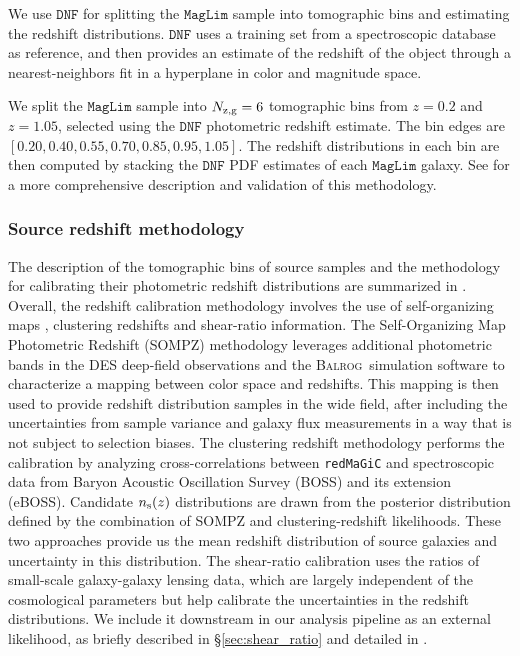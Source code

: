 \documentclass[aps, prd,twocolumn,superscriptaddress,nofootinbib,preprintnumbers]{revtex4-1}
\newcommand{\redmagic}{\texttt{redMaGiC} }
\newcommand{\maglim}{\texttt{MagLim} }
\newcommand{\balrog}{{\textsc{Balrog}}}
\begin{document}
We use $\texttt{DNF}$ \citep{DNF2016} for splitting the $\maglim$ sample into tomographic bins and estimating the redshift distributions. $\texttt{DNF}$  uses a training set from a spectroscopic database as reference, and then provides an estimate of the redshift of the object through a nearest-neighbors fit in a hyperplane in color and magnitude space.

We split the $\maglim$ sample into $N_{\rm z,g} = 6$ tomographic bins from $z=0.2$ and $z=1.05$, selected using the $\texttt{DNF}$ photometric redshift estimate. The bin edges are $[0.20, 0.40, 0.55, 0.70, 0.85, 0.95, 1.05]$. The redshift distributions in each bin are then computed by stacking the $\texttt{DNF}$ PDF estimates of each $\maglim$ galaxy. See \cite{y3-2x2ptaltlensresults} for a more comprehensive description and validation of this methodology.

\subsubsection{Source redshift methodology}
\label{sec:sourcez}
The description of the tomographic bins of source samples and the methodology for calibrating their photometric redshift distributions are summarized in \citet*{y3-sompz}. Overall, the redshift calibration methodology involves the use of self-organizing maps \citep{y3-sompz}, clustering redshifts \citep{y3-sourcewz} and shear-ratio \citep{y3-shearratio} information. The Self-Organizing Map Photometric Redshift (SOMPZ) methodology leverages additional photometric bands in the DES deep-field observations \citep{y3-deepfields} and the \balrog\ simulation software \citep{balrog_21} to characterize a mapping between color space and redshifts. This mapping is then used to provide redshift distribution samples in the wide field, after including the uncertainties from sample variance and galaxy flux measurements in a way that is not subject to selection biases. The clustering redshift methodology performs the calibration by analyzing cross-correlations between \redmagic and spectroscopic data from Baryon Acoustic Oscillation Survey (BOSS) and its extension (eBOSS). Candidate $n_{\rm s}(z)$ distributions are drawn from the posterior distribution defined by the combination of SOMPZ and clustering-redshift likelihoods.
These two approaches provide us the mean redshift distribution of source galaxies and uncertainty in this distribution. The shear-ratio calibration uses the ratios of small-scale galaxy-galaxy lensing data, which are largely independent of the cosmological parameters but help calibrate the uncertainties in the redshift distributions. We include it downstream in our analysis pipeline as an external likelihood, as briefly described in \S\ref{sec:shear_ratio} and detailed in \citet*{y3-shearratio}. 
\end{document}
